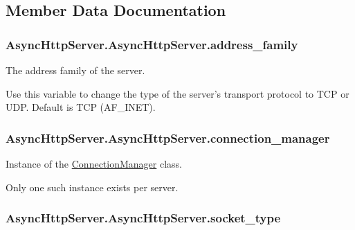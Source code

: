 \subsection{Member Data Documentation}
\hypertarget{class_async_http_server_1_1_async_http_server_ad6c600941d9ab1f0e5880290db2dcb93}{
\subsubsection[{address\-\_\-family}]{\setlength{\rightskip}{0pt plus 5cm}Async\-Http\-Server.\-Async\-Http\-Server.\-address\-\_\-family}}\label{class_async_http_server_1_1_async_http_server_ad6c600941d9ab1f0e5880290db2dcb93}


The address family of the server. 

Use this variable to change the type of the server's transport protocol to T\-C\-P or U\-D\-P. Default is T\-C\-P (A\-F\-\_\-\-I\-N\-E\-T). \hypertarget{class_async_http_server_1_1_async_http_server_aab2a41d288f15308d305bff00e922200}{
\subsubsection[{connection\-\_\-manager}]{\setlength{\rightskip}{0pt plus 5cm}Async\-Http\-Server.\-Async\-Http\-Server.\-connection\-\_\-manager}}\label{class_async_http_server_1_1_async_http_server_aab2a41d288f15308d305bff00e922200}


Instance of the \hyperlink{namespace_connection_manager}{Connection\-Manager} class. 

Only one such instance exists per server. \hypertarget{class_async_http_server_1_1_async_http_server_ae703825864891b7c4f1f69eb541eb64f}{
\subsubsection[{socket\-\_\-type}]{\setlength{\rightskip}{0pt plus 5cm}Async\-Http\-Server.\-Async\-Http\-Server.\-socket\-\_\-type}}\label{class_async_http_server_1_1_async_http_server_ae703825864891b7c4f1f69eb541eb64f}



